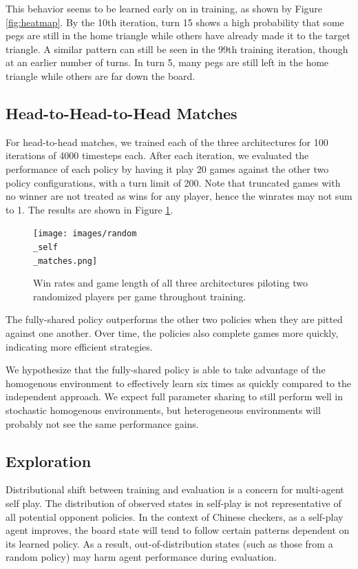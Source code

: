 \documentclass[12pt, a4paper, twocolumn]{article}
\begin{document}
This behavior seems to be learned early on in training, as shown by Figure \ref{fig:heatmap}. By the 10th iteration, turn 15 shows a high probability that some pegs are still in the home triangle while others have already made it to the target triangle. A similar pattern can still be seen in the 99th training iteration, though at an earlier number of turns. In turn 5, many pegs are still left in the home triangle while others are far down the board.

\subsection{Head-to-Head-to-Head Matches}

For head-to-head matches, we trained each of the three architectures for 100 iterations of 4000 timesteps each. After each iteration, we evaluated the performance of each policy by having it play 20 games against the other two policy configurations, with a turn limit of 200. Note that truncated games with no winner are not treated as wins for any player, hence the winrates may not sum to 1. The results are shown in Figure \ref{fig:archmatches}.

\begin{figure}[h]
  \centering
    \texttt{[image: images/random\\\_self\\\_matches.png]}
  \caption{Win rates and game length of all three architectures piloting two randomized players per game throughout training.}\label{fig:archmatches}
\end{figure}

The fully-shared policy outperforms the other two policies when they are pitted against one another. Over time, the policies also complete games more quickly, indicating more efficient strategies.

We hypothesize that the fully-shared policy is able to take advantage of the homogenous environment to effectively learn six times as quickly compared to the independent approach. We expect full parameter sharing to still perform well in stochastic homogenous environments, but heterogeneous environments will probably not see the same performance gains.

\subsection{Exploration}

Distributional shift between training and evaluation is a concern for multi-agent self play. The distribution of observed states in self-play is not representative of all potential opponent policies. In the context of Chinese checkers, as a self-play agent improves, the board state will tend to follow certain patterns dependent on its learned policy. As a result, out-of-distribution states (such as those from a random policy) may harm agent performance during evaluation.
\end{document}
